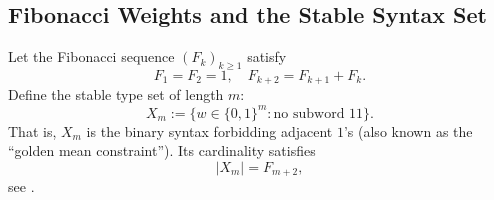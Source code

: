\subsection{Fibonacci Weights and the Stable Syntax Set}\label{subsec:folding-fibonacci-stable-syntax}

Let the Fibonacci sequence $(F_k)_{k\ge1}$ satisfy
\[
F_1=F_2=1,\quad F_{k+2}=F_{k+1}+F_k.
\]
Define the stable type set of length $m$:
\[
X_m:=\{w\in\{0,1\}^m:\text{no subword }11\}.
\]
That is, $X_m$ is the binary syntax forbidding adjacent $1$'s (also known as the ``golden mean constraint''). Its cardinality satisfies
\[
|X_m|=F_{m+2},
\]
see \cite{LindMarcus1995}.
